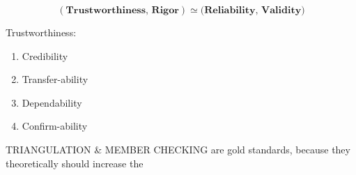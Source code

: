 \documentclass{TC}
\begin{document}
$$(\textbf{Trustworthiness, Rigor}) \simeq (\textbf{Reliability, Validity)}$$

Trustworthiness:
\begin{enumerate}
\item Credibility
\item Transfer-ability
\item Dependability
\item Confirm-ability 
\end{enumerate}

TRIANGULATION \& MEMBER CHECKING are gold standards, because they theoretically should increase the 
\end{document}
